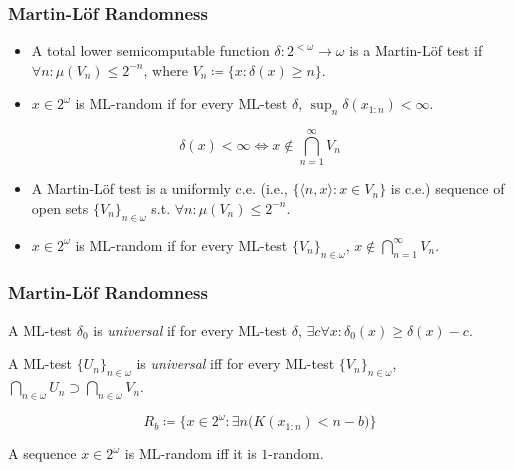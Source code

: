 \documentclass[UTF8,11pt,colorlinks,compress,openany]{beamer}%
\begin{document}
\begin{frame}\frametitle{Martin-L\"of Randomness}
\setlength\abovedisplayskip{0pt}
\setlength\belowdisplayskip{0pt}
\begin{definition}
\begin{itemize}
	\item A total lower semicomputable function $\delta: 2^{<\omega}\to\omega$ is a Martin-Löf test if $\forall n:\mu(V_n)\leq 2^{-n}$, where $V_n\coloneqq \{x:\delta(x)\geq n\}$.
	\item $x\in 2^\omega$ is ML-random if for every ML-test $\delta$, $\sup_n\delta(x_{1:n})<\infty$.
\end{itemize}
\end{definition}
\[\delta(x)<\infty\iff x\notin\bigcap\limits_{n=1}^\infty V_n\]
\begin{definition}
\begin{itemize}
	\item A Martin-Löf test is a uniformly c.e. (i.e., $\big\{\langle n,x\rangle: x\in V_n\big\}$ is c.e.) sequence of open sets $\{V_n\}_{n\in\omega}$ s.t. $\forall n: \mu(V_n)\leq 2^{-n}$.
	\item $x\in 2^\omega$ is ML-random if for every ML-test $\{V_n\}_{n\in\omega}$, $x\notin\bigcap\limits_{n=1}^\infty V_n$.
\end{itemize}
\end{definition}
\end{frame}

\begin{frame}\frametitle{Martin-L\"of Randomness}
\setlength\abovedisplayskip{0pt}
\setlength\belowdisplayskip{0pt}
\begin{definition}
A ML-test $\delta_0$ is \emph{universal} if for every ML-test $\delta$, $\exists c\forall x:\delta_0(x)\geq\delta(x)-c$.
\end{definition}
A ML-test $\{U_n\}_{n\in\omega}$ is \emph{universal} iff for every ML-test $\{V_n\}_{n\in\omega}$, $\bigcap\limits_{n\in\omega}U_n\supset\bigcap\limits_{n\in\omega}V_n$.
\begin{center}
\end{center}
\[R_b\coloneqq \big\{x\in 2^\omega:\exists n\big(K(x_{1:n})<n-b\big)\big\}\]
\begin{center}
\end{center}
\begin{theorem}[Schnorr 1973]
A sequence $x\in 2^\omega$ is ML-random iff it is $1$-random.
\end{theorem}
\end{frame}
\end{document}
